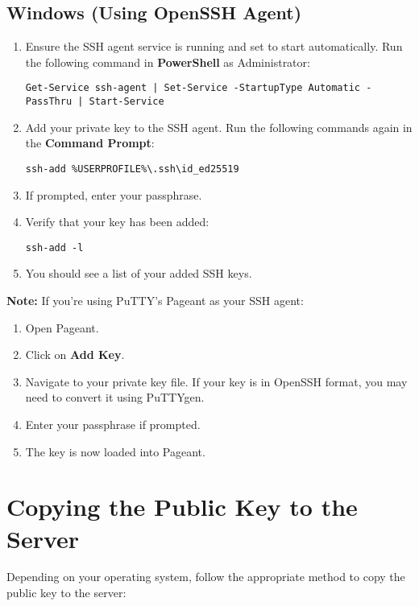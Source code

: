 \documentclass[12pt,letterpaper]{article}
\begin{document}
\subsection{Windows (Using OpenSSH Agent)}

\begin{enumerate}
    \item Ensure the SSH agent service is running and set to start automatically. Run the following command in \textbf{PowerShell} as Administrator:
    \begin{lstlisting}[style=custombash]
Get-Service ssh-agent | Set-Service -StartupType Automatic -PassThru | Start-Service
    \end{lstlisting}
    \item Add your private key to the SSH agent. Run the following commands again in the \textbf{Command Prompt}:
    \begin{lstlisting}[style=custombash]
ssh-add %USERPROFILE%\.ssh\id_ed25519
    \end{lstlisting}
    \item If prompted, enter your passphrase.
    \item Verify that your key has been added:
    \begin{lstlisting}[style=custombash]
ssh-add -l
    \end{lstlisting}
    \item You should see a list of your added SSH keys.
\end{enumerate}

\textbf{Note:} If you're using PuTTY's Pageant as your SSH agent:

\begin{enumerate}
    \item Open Pageant.
    \item Click on \textbf{Add Key}.
    \item Navigate to your private key file. If your key is in OpenSSH format, you may need to convert it using PuTTYgen.
    \item Enter your passphrase if prompted.
    \item The key is now loaded into Pageant.
\end{enumerate}

\section{Copying the Public Key to the Server}
Depending on your operating system, follow the appropriate method to copy the public key to the server:
\end{document}
